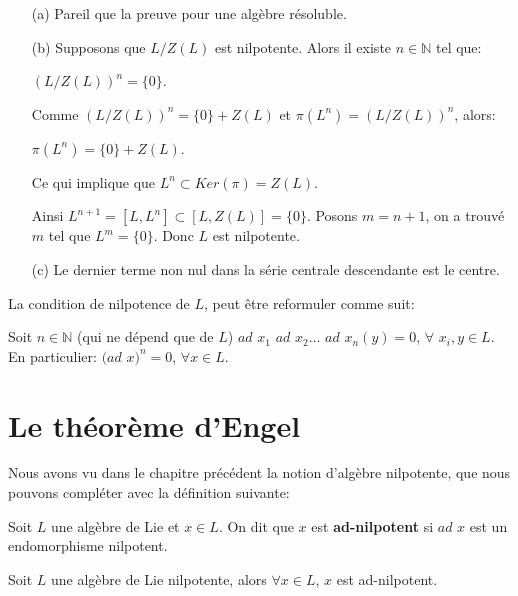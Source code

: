 \documentclass[a4paper,openany,12pt]{report}
\newcommand{\NN}{\mathbb{N}}
\theoremstyle{break}
{\theorembodyfont{\upshape}
\newtheorem*{rmq}{Remarque :}
\newtheorem*{prv}{Preuve :}
\newtheorem*{ex}{Exemples :}
\newtheorem*{exe}{Exemple : }
\newtheorem*{nota}{Notation :}
\newtheorem*{dem}{D\'emonstration :}}
\begin{document}
\begin{prv}
\begin{itemize}
\item[(a)]  Pareil que la preuve pour une algèbre résoluble.
\item[(b)]  Supposons que $L/Z(L)$ est nilpotente. Alors il existe $n \in \NN$ tel que:
\begin{center}
$(L/Z(L))^{n}= \{ 0 \}$.
\end{center} 

Comme $(L/Z(L))^{n}= \{ 0 \} +Z(L)$ et $\pi(L^n) = (L/Z(L))^{n}$, alors:
\begin{center}
$\pi(L^n)= \{0\} +Z(L)$.
\end{center}
Ce qui implique que $L^n \subset Ker(\pi)=Z(L)$.

Ainsi $L^{n+1}=[L,L^n] \subset [L,Z(L)]= \{0\}$. Posons $m = n+1$, on a trouvé $m$ tel que $L^m= \{0\}$. Donc $L$ est nilpotente.

\item[(c)] Le dernier terme non nul dans la série centrale descendante est le centre.
\end{itemize}
\end{prv}

\begin{rmq}
\quad La condition de nilpotence de $L$, peut être reformuler comme suit:

Soit $n \in \NN$ (qui ne dépend que de $L$) $ad$ $x_{1}$ $ad$ $x_{2} \ldots$ $ad$ $x_{n}(y)=0$,  $\forall$ $x_{i}, y \in L$.
En particulier:
$(ad$ $x)^n = 0$, $\forall x \in L$.
\end{rmq}


\chapter{Le théorème d'Engel}

\quad Nous avons vu dans le chapitre précédent la notion d'algèbre nilpotente, que nous pouvons compléter avec la définition suivante:

\begin{df}
\quad Soit $L$ une algèbre de Lie et $x \in L$. On dit que $x$ est \textbf{ad-nilpotent} si $ad$ $x$ est un endomorphisme nilpotent. 
\end{df}

\begin{prop}\label{prop:E1}
\quad Soit $L$ une algèbre de Lie nilpotente, alors $\forall x \in L$, $x$ est ad-nilpotent.
\end{prop}
\end{document}
